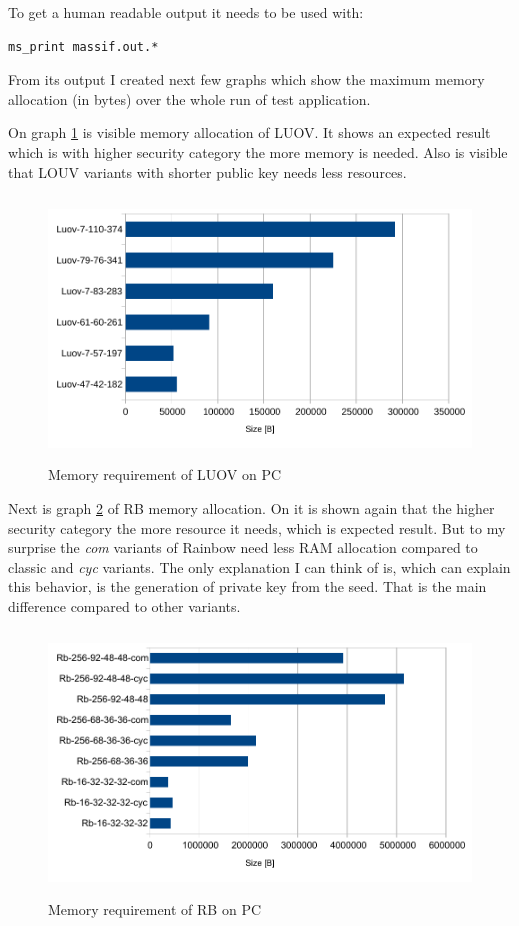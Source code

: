\documentclass[thesis=M,english]{FITthesis}[2019/12/23]
\begin{document}
\noindent
To get a human readable output it needs to be used with:
\begin{lstlisting}[frame=single]
ms_print massif.out.*
\end{lstlisting}
\noindent
From its output I created next few graphs which show the maximum memory allocation (in bytes) over the whole run of test application. 

\bigskip
\noindent
On graph \ref{mem-pc-luov} is visible memory allocation of LUOV. It shows an expected result which is with higher security category the more memory is needed. Also is visible that LOUV variants with shorter public key needs less resources.

\begin{figure}[H]
\centering
\includegraphics[width=13cm,height=7cm]{images/mem-pc-luov.pdf}
\caption{Memory requirement of LUOV on PC}
\label{mem-pc-luov}
\end{figure}

\noindent
Next is graph \ref{mem-pc-rb} of RB memory allocation. On it is shown again that the higher security category the more resource it needs, which is expected result. But to my surprise the \textit{com} variants of Rainbow need less RAM allocation compared to classic and \textit{cyc} variants. The only explanation I can think of is, which can explain this behavior, is the generation of private key from the seed. That is the main difference compared to other variants.
\begin{figure}[H]
\centering
\includegraphics[width=13cm,height=7cm]{images/mem-pc-rb.pdf}
\caption{Memory requirement of RB on PC}
\label{mem-pc-rb}
\end{figure}
\end{document}
